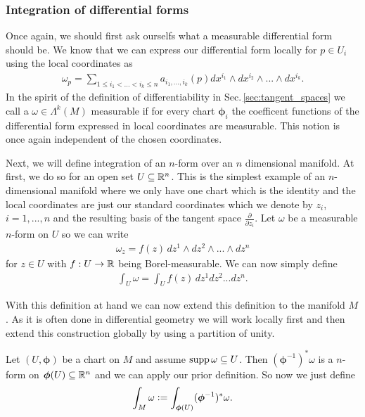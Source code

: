 \documentclass[../main.tex]{subfiles}
\begin{document}
\subsubsection{Integration of differential forms}\label{sec:integration_differential_forms_subsection}

Once again, we should first ask ourselfs what a measurable differential form 
should be. We know that we can express our differential form locally 
for $p \in U_i$ using the local coordinates as 
\begin{align*}
    \omega_p = \sum\limits_{1\leq i_1 < ... < i_k \leq n} 
        a_{i_1,...,i_k}(p) dx^{i_1} \wedge dx^{i_2} \wedge ... \wedge dx^{i_k}.
\end{align*}
In the spirit of the definition of differentiability 
in Sec.\,\ref{sec:tangent_spaces} we call a $\omega \in \Lambda^k (M)$
measurable if for every chart $\boldsymbol{\phi}_i$ the coefficent functions of the 
differential form expressed in local coordinates 
are measurable. This notion is once again independent of the chosen 
coordinates.

Next, we will define integration of an $n$-form over an $n$ dimensional 
manifold. At first, we do so for an open set $U \subseteq \mathbb{R}^n$.
This is the simplest example of an $n$-dimensional manifold where 
we only have one chart which is the identity and the local coordinates are 
just our standard coordinates which we denote by $z_i$, $i=1,...,n$ and the 
resulting basis of the tangent space $\frac{\partial}{\partial z_i}$. 
Let $\omega$ be a measurable 
$n$-form on $U$ so we can 
write 
\begin{align*}
    \omega_z = f(z)\, dz^1 \wedge dz^2 \wedge ... \wedge dz^n
\end{align*}
for $z \in U$ with $f:U \rightarrow \mathbb{R}$ being Borel-measurable. 
We can now simply define 
\begin{align*}
    \int_U \omega = \int_U f(z) \, dz^1 dz^2 ... dz^n.
\end{align*}

With this definition at hand we can now extend this definition to 
the manifold $M$. As it is often done in 
differential geometry we will work locally first and then extend this 
construction globally by using a partition of unity.

Let $(U,\boldsymbol{\phi})$ be a chart on $M$ and assume $\operatorname{supp} \omega \subseteq U$. 
Then $(\boldsymbol{\phi}^{-1})^* \omega$
is a $n$-form on $\boldsymbol{\phi}(U) \subseteq \mathbb{R}^n$ and 
we can apply our prior definition. So now we just define 
\begin{align*}
    \int_M \omega \vcentcolon= \int_{\boldsymbol{\phi}(U)} (\boldsymbol{\phi}^{-1})^* \omega.
\end{align*}
\end{document}
